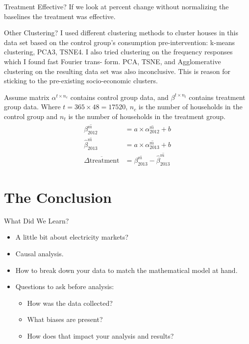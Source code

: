 \documentclass{beamer}
\begin{document}
\begin{frame}{Treatment Effective?}
  If we look at percent change without normalizing the baselines the treatment was effective.
\end{frame}

\begin{frame}{Other Clustering?}
  I used different clustering methods to cluster houses in this data set based on the control group’s consumption pre-intervention: k-means clustering, PCA3, TSNE4. I also tried clustering on the frequency responses which I found fast Fourier trans- form. PCA, TSNE, and Agglomerative clustering on the resulting data set was also inconclusive. This is reason for sticking to the pre-existing socio-economic clusters.
\end{frame}

\begin{frame}
  Assume matrix $\alpha^{t \times n_c}$ contains control group data, and $\beta^{t \times n_t}$ contains treatment group data. Where $t = 365 \times 48 = 17520$, $n_c$ is the number of households in the control group and $n_t$ is the number of households in the treatment group.
  \begin{align}
    \begin{split}
      \overline{\beta^m_{2012}} &= a \times \overline{\alpha^m_{2012}} + b \\
      \overline{\hat{\beta}^m_{2013}} &= a \times \overline{\alpha^m_{2013}} + b \\
      \overline{\Delta\mbox{treatment}} &= \overline{\beta^m_{2013}} - \overline{\hat{\beta}^m_{2013}}
    \end{split}
  \end{align}
\end{frame}

\section{The Conclusion}

\begin{frame}{What Did We Learn?}
  \begin{itemize}
    \item<+-> A little bit about electricity markets?
    \item<+-> Causal analysis.
    \item<+-> How to break down your data to match the mathematical model at hand.
    \item<+-> Questions to ask before analysis:
    \begin{itemize}
      \item<+-> How was the data collected? 
      \item<+-> What biases are present?
      \item<+-> How does that impact your analysis and results?
    \end{itemize}
  \end{itemize}
\end{frame}
\end{document}
